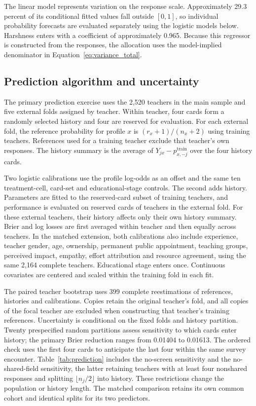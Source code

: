 The linear model represents variation on the response scale. Approximately 29.3 percent of its conditional fitted values fall outside $[0,1]$, so individual probability forecasts are evaluated separately using the logistic models below. Harshness enters with a coefficient of approximately 0.965. Because this regressor is constructed from the responses, the allocation uses the model-implied denominator in Equation~\ref{eq:variance_total}.

\subsection{Prediction algorithm and uncertainty}
The primary prediction exercise uses the 2,520 teachers in the main sample and five external folds assigned by teacher. Within teacher, four cards form a randomly selected history and four are reserved for evaluation. For each external fold, the reference probability for profile $x$ is $(r_x+1)/(n_x+2)$ using training teachers. References used for a training teacher exclude that teacher's own responses. The history summary is the average of $Y_{jx}-p_{x,-j}^{\mathrm{train}}$ over the four history cards.

Two logistic calibrations use the profile log-odds as an offset and the same ten treatment-cell, card-set and educational-stage controls. The second adds history. Parameters are fitted to the reserved-card subset of training teachers, and performance is evaluated on reserved cards of teachers in the external fold. For these external teachers, their history affects only their own history summary. Brier and log losses are first averaged within teacher and then equally across teachers. In the matched extension, both calibrations also include experience, teacher gender, age, ownership, permanent public appointment, teaching groups, perceived impact, empathy, effort attribution and resource agreement, using the same 2,164 complete teachers. Educational stage enters once. Continuous covariates are centered and scaled within the training fold in each fit.

The paired teacher bootstrap uses 399 complete reestimations of references, histories and calibrations. Copies retain the original teacher's fold, and all copies of the focal teacher are excluded when constructing that teacher's training references. Uncertainty is conditional on the fixed folds and history partition. Twenty prespecified random partitions assess sensitivity to which cards enter history; the primary Brier reduction ranges from 0.01404 to 0.01613. The ordered check uses the first four cards to anticipate the last four within the same survey encounter. Table~\ref{tab:prediction} includes the no-screen sensitivity and the no-shared-field sensitivity, the latter retaining teachers with at least four nonshared responses and splitting $\lfloor n_j/2\rfloor$ into history. These restrictions change the population or history length. The matched comparison retains its own common cohort and identical splits for its two predictors.
\enlargethispage{\baselineskip}


